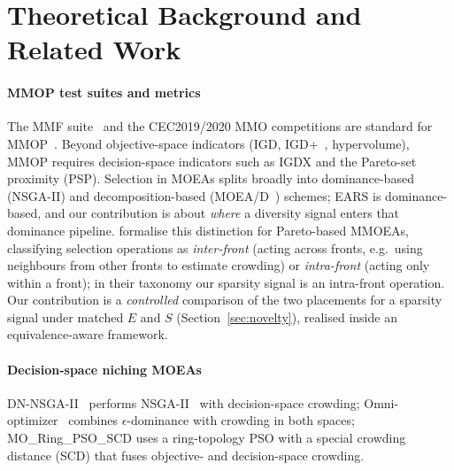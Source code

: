 \section{Theoretical Background and Related Work}
\label{sec:related}

\paragraph{MMOP test suites and metrics} The MMF suite~\parencite{yue2018moring,yue2019mmf}
and the CEC2019/2020 MMO competitions are standard for MMOP~\parencite{tanabe2020review}. Beyond
objective-space indicators (IGD, IGD+~\parencite{ishibuchi2015igdplus}, hypervolume), MMOP requires
decision-space indicators such as IGDX and the Pareto-set proximity (PSP). Selection in MOEAs
splits broadly into dominance-based (NSGA-II) and decomposition-based
(MOEA/D~\parencite{zhang2007moead}) schemes; EARS is dominance-based, and our contribution is about
\emph{where} a diversity signal enters that dominance pipeline. \textcite{javadi2022interfront}
formalise this distinction for Pareto-based MMOEAs,
classifying selection operations as \emph{inter-front} (acting across fronts, e.g.\ using
neighbours from other fronts to estimate crowding) or \emph{intra-front} (acting only within a
front); in their taxonomy our sparsity signal is an intra-front operation. Our contribution is a
\emph{controlled} comparison of the two placements for a sparsity signal under matched
$E$ and $S$ (Section~\ref{sec:novelty}), realised inside an equivalence-aware framework.

\paragraph{Decision-space niching MOEAs} DN-NSGA-II~\parencite{liang2016dnnsga2} performs
NSGA-II~\parencite{deb2002nsga2} with decision-space crowding; Omni-optimizer~\parencite{deb2008omni}
combines $\epsilon$-dominance with crowding in both spaces; MO\_Ring\_PSO\_SCD
\parencite{yue2018moring} uses a ring-topology PSO with a special crowding distance (SCD) that
fuses objective- and decision-space crowding.

